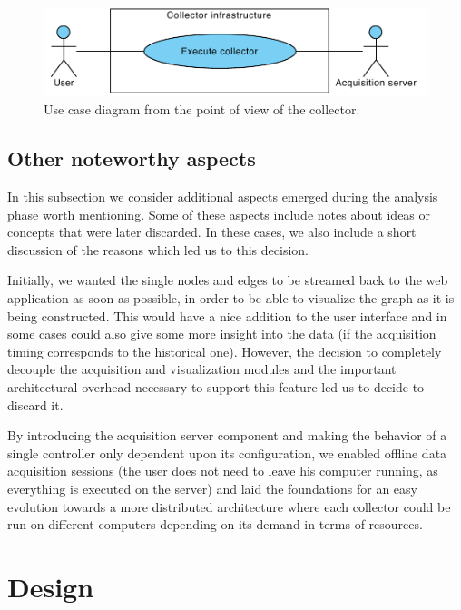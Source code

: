 \begin{figure}[p]
  \centering
  \includegraphics[width=0.67\linewidth]{images/diagrams/uc-collector}
  \caption[Use case diagram for the collector.]{Use case diagram from the point of view of the collector.}
  \label{fig:uc-collector}
\end{figure}


\subsection{Other noteworthy aspects}

In this subsection we consider additional aspects emerged during the analysis phase worth mentioning. Some of these aspects include notes about ideas or concepts that were later discarded. In these cases, we also include a short discussion of the reasons which led us to this decision.

Initially, we wanted the single nodes and edges to be streamed back to the web application as soon as possible, in order to be able to visualize the graph as it is being constructed. This would have a nice addition to the user interface and in some cases could also give some more insight into the data (if the acquisition timing corresponds to the historical one). However, the decision to completely decouple the acquisition and visualization modules and the important architectural overhead necessary to support this feature led us to decide to discard it.

By introducing the acquisition server component and making the behavior of a single controller only dependent upon its configuration, we enabled offline data acquisition sessions (the user does not need to leave his computer running, as everything is executed on the server) and laid the foundations for an easy evolution towards a more distributed architecture where each collector could be run on different computers depending on its demand in terms of resources.


\section{Design}


